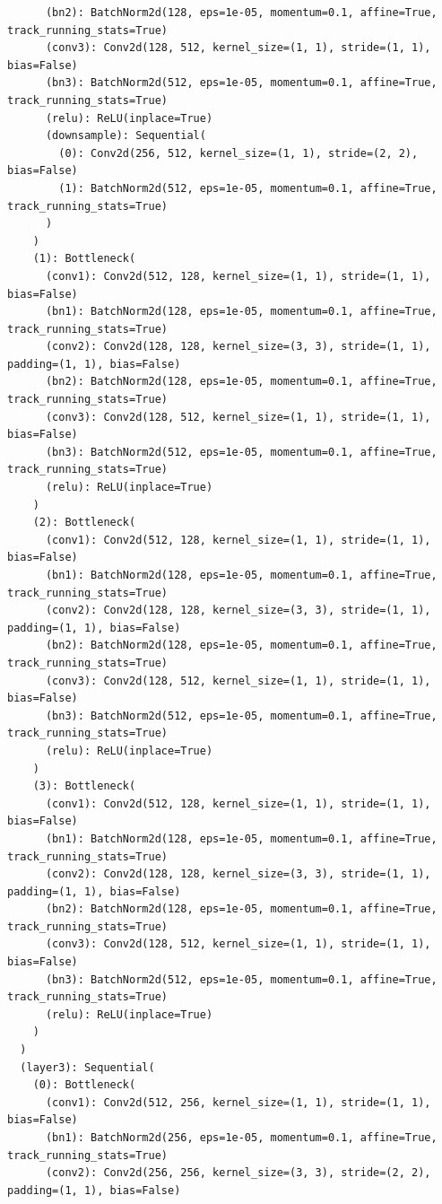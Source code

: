 \documentclass{article}
\begin{document}
\begin{verbatim}
      (bn2): BatchNorm2d(128, eps=1e-05, momentum=0.1, affine=True, track_running_stats=True)
      (conv3): Conv2d(128, 512, kernel_size=(1, 1), stride=(1, 1), bias=False)
      (bn3): BatchNorm2d(512, eps=1e-05, momentum=0.1, affine=True, track_running_stats=True)
      (relu): ReLU(inplace=True)
      (downsample): Sequential(
        (0): Conv2d(256, 512, kernel_size=(1, 1), stride=(2, 2), bias=False)
        (1): BatchNorm2d(512, eps=1e-05, momentum=0.1, affine=True, track_running_stats=True)
      )
    )
    (1): Bottleneck(
      (conv1): Conv2d(512, 128, kernel_size=(1, 1), stride=(1, 1), bias=False)
      (bn1): BatchNorm2d(128, eps=1e-05, momentum=0.1, affine=True, track_running_stats=True)
      (conv2): Conv2d(128, 128, kernel_size=(3, 3), stride=(1, 1), padding=(1, 1), bias=False)
      (bn2): BatchNorm2d(128, eps=1e-05, momentum=0.1, affine=True, track_running_stats=True)
      (conv3): Conv2d(128, 512, kernel_size=(1, 1), stride=(1, 1), bias=False)
      (bn3): BatchNorm2d(512, eps=1e-05, momentum=0.1, affine=True, track_running_stats=True)
      (relu): ReLU(inplace=True)
    )
    (2): Bottleneck(
      (conv1): Conv2d(512, 128, kernel_size=(1, 1), stride=(1, 1), bias=False)
      (bn1): BatchNorm2d(128, eps=1e-05, momentum=0.1, affine=True, track_running_stats=True)
      (conv2): Conv2d(128, 128, kernel_size=(3, 3), stride=(1, 1), padding=(1, 1), bias=False)
      (bn2): BatchNorm2d(128, eps=1e-05, momentum=0.1, affine=True, track_running_stats=True)
      (conv3): Conv2d(128, 512, kernel_size=(1, 1), stride=(1, 1), bias=False)
      (bn3): BatchNorm2d(512, eps=1e-05, momentum=0.1, affine=True, track_running_stats=True)
      (relu): ReLU(inplace=True)
    )
    (3): Bottleneck(
      (conv1): Conv2d(512, 128, kernel_size=(1, 1), stride=(1, 1), bias=False)
      (bn1): BatchNorm2d(128, eps=1e-05, momentum=0.1, affine=True, track_running_stats=True)
      (conv2): Conv2d(128, 128, kernel_size=(3, 3), stride=(1, 1), padding=(1, 1), bias=False)
      (bn2): BatchNorm2d(128, eps=1e-05, momentum=0.1, affine=True, track_running_stats=True)
      (conv3): Conv2d(128, 512, kernel_size=(1, 1), stride=(1, 1), bias=False)
      (bn3): BatchNorm2d(512, eps=1e-05, momentum=0.1, affine=True, track_running_stats=True)
      (relu): ReLU(inplace=True)
    )
  )
  (layer3): Sequential(
    (0): Bottleneck(
      (conv1): Conv2d(512, 256, kernel_size=(1, 1), stride=(1, 1), bias=False)
      (bn1): BatchNorm2d(256, eps=1e-05, momentum=0.1, affine=True, track_running_stats=True)
      (conv2): Conv2d(256, 256, kernel_size=(3, 3), stride=(2, 2), padding=(1, 1), bias=False)

\end{verbatim}
\end{document}
